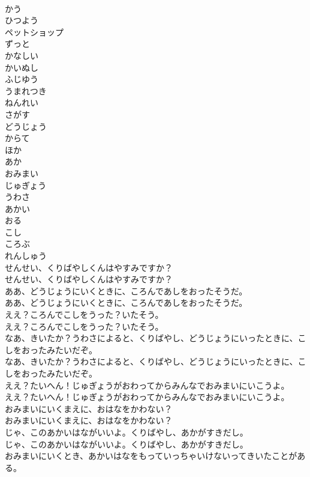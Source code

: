 \documentclass[8pt]{extreport}
\begin{document}
\begin{CJK}{UTF8}{min}
\\	かう
\\	ひつよう
\\	ペットショップ
\\	ずっと
\\	かなしい
\\	かいぬし
\\	ふじゆう
\\	うまれつき
\\	ねんれい
\\	さがす
\\	どうじょう
\\	からて
\\	ほか
\\	あか
\\	おみまい
\\	じゅぎょう
\\	うわさ
\\	あかい
\\	おる
\\	こし
\\	ころぶ
\\	れんしゅう
\\	せんせい、くりばやしくんはやすみですか？	
\\	せんせい、くりばやしくんはやすみですか？ 
\\	ああ、どうじょうにいくときに、ころんであしをおったそうだ。	
\\	ああ、どうじょうにいくときに、ころんであしをおったそうだ。 
\\	ええ？ころんでこしをうった？いたそう。	
\\	ええ？ころんでこしをうった？いたそう。 
\\	なあ、きいたか？うわさによると、くりばやし、どうじょうにいったときに、こしをおったみたいだぞ。	
\\	なあ、きいたか？うわさによると、くりばやし、どうじょうにいったときに、こしをおったみたいだぞ。 
\\	ええ？たいへん！じゅぎょうがおわってからみんなでおみまいにいこうよ。	
\\	ええ？たいへん！じゅぎょうがおわってからみんなでおみまいにいこうよ。 
\\	おみまいにいくまえに、おはなをかわない？	
\\	おみまいにいくまえに、おはなをかわない？ 
\\	じゃ、このあかいはながいいよ。くりばやし、あかがすきだし。	
\\	じゃ、このあかいはながいいよ。くりばやし、あかがすきだし。 
\\	おみまいにいくとき、あかいはなをもっていっちゃいけないってきいたことがある。	

\end{CJK}
\end{document}
